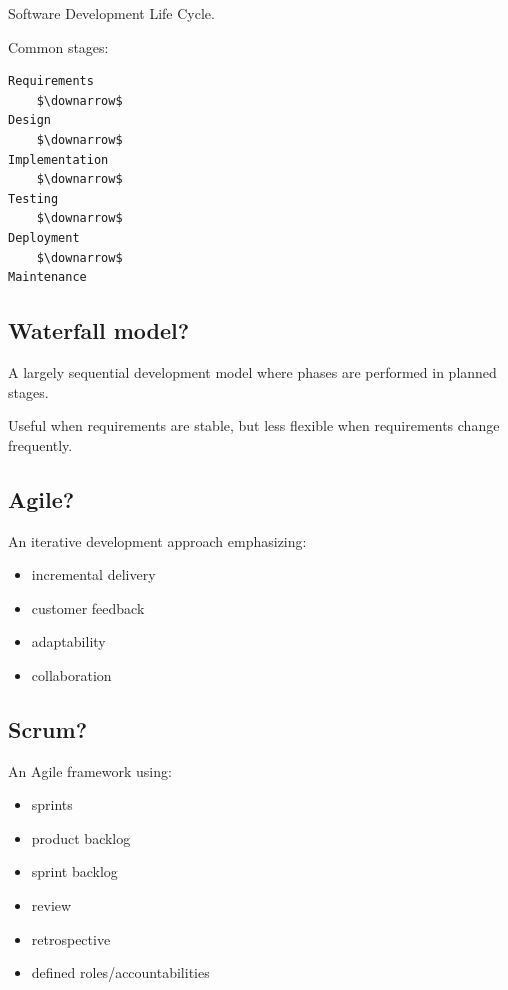 Software Development Life Cycle.

Common stages:

\begin{lstlisting}
Requirements
    $\downarrow$
Design
    $\downarrow$
Implementation
    $\downarrow$
Testing
    $\downarrow$
Deployment
    $\downarrow$
Maintenance
\end{lstlisting}

\medskip

\subsection{Waterfall model?}

A largely sequential development model where phases are performed in planned stages.

Useful when requirements are stable, but less flexible when requirements change frequently.

\medskip

\subsection{Agile?}

An iterative development approach emphasizing:

\begin{itemize}
  \item incremental delivery
  \item customer feedback
  \item adaptability
  \item collaboration
\end{itemize}

\medskip

\subsection{Scrum?}

An Agile framework using:

\begin{itemize}
  \item sprints
  \item product backlog
  \item sprint backlog
  \item review
  \item retrospective
  \item defined roles/accountabilities
\end{itemize}

